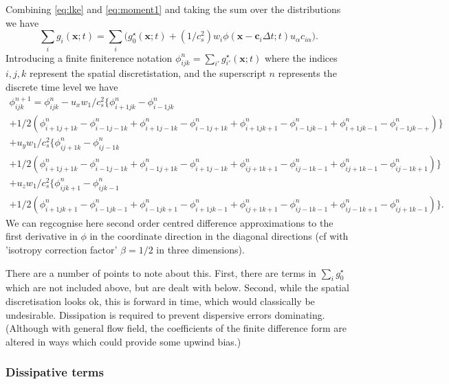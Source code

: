 Combining \ref{eq:lke} and \ref{eq:moment1} and taking the sum over
the distributions we have
\begin{equation}
\sum_i g_i (\mathbf{x};t) = \sum_i \Big( g_0^\star (\mathbf{x};t)  +
(1/c_s^2)  w_i \phi (\mathbf{x} - \mathbf{c}_i \Delta t;t)
u_\alpha c_{i\alpha} \Big).
\end{equation}
Introducing a finite finiterence notation $\phi_{ijk}^n
= \sum_{i'} g_{i'}^\star (\mathbf{x}; t)$ where the indices $i,j,k$
represent the spatial discretistation, and the superscript $n$ represents
the discrete time level we have
\begin{eqnarray}
\phi_{ijk}^{n+1}  = \phi_{ijk}^n - u_x w_1/c_s^2 \Big\{
\phi_{i+1 j k}^n - \phi_{i-1 j k}^n \\
+ 1/2(
\phi_{i+1 j+1 k}^n - \phi_{i-1 j-1 k}^n +
\phi_{i+1 j-1 k}^n - \phi_{i-1 j+1 k}^n +
\phi_{i+1 j k+1}^n - \phi_{i-1 j k-1}^n +
\phi_{i+1 j k-1}^n - \phi_{i-1 j k-+}^n)
\Big\} \\ +
u_y w_1 / c_s^2 \Big\{
\phi_{i j+1 k}^n - \phi_{i j-1 k}^n \\
+ 1/2 (
\phi_{i+1 j+1 k}^n - \phi_{i-1 j-1 k}^n +
\phi_{i-1 j+1 k}^n - \phi_{i+1 j-1 k}^n +
\phi_{i j+1 k+1}^n - \phi_{i j-1 k-1}^n +
\phi_{i j+1 k-1}^n - \phi_{i j-1 k+1}^n)
\Big\} \\ +
u_z w_1 / c_s^2 \Big\{
\phi_{i j k+1}^n - \phi_{i j k-1}^n \\
+ 1/2 (
\phi_{i+1 j k+1}^n - \phi_{i-1 j k-1}^n +
\phi_{i-1 j k+1}^n - \phi_{i+1 j k-1}^n +
\phi_{i j+1 k+1}^n - \phi_{i j-1 k-1}^n +
\phi_{i j-1 k+1}^n - \phi_{i j+1 k-1}^n) \Big\}.
\end{eqnarray}
We can regcognise here second order centred difference approximations to
the first derivative in $\phi$ in the coordinate direction in the
diagonal directions (cf \cite{sescu2008} with 'isotropy correction factor'
$\beta = 1/2$ in three dimensions).

There are a number of points to note about this. First, there are
terms in $\sum_i g_0^\star$ which are not included above, but are dealt
with below. Second, while the spatial discretisation looks ok, this is
forward in time, which would classically be undesirable. Dissipation
is required to prevent dispersive errors dominating. (Although with
general flow field, the coefficients of the finite difference form are
altered in ways which could provide some upwind bias.)

\subsubsection{Dissipative terms} 

